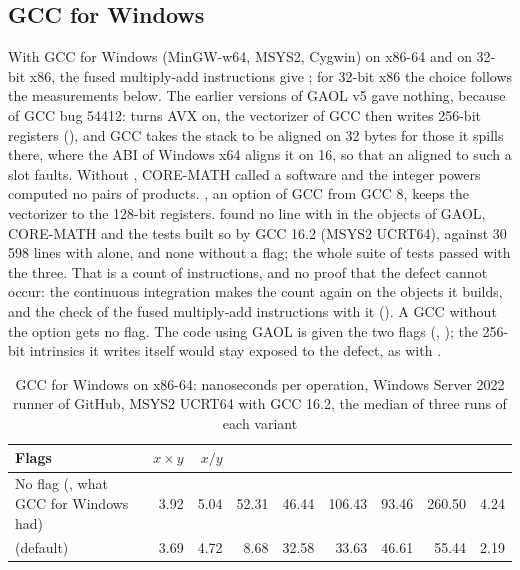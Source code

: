 \subsection{GCC for Windows}\label{sec:install-gcc-windows}

With GCC for Windows (MinGW-w64, MSYS2, Cygwin) on x86-64 and on 32-bit x86,
the fused multiply-add instructions give
; for 32-bit x86 the choice follows
the measurements below.\newinvfive{} The earlier versions of GAOL v5 gave nothing, because of GCC bug
54412:  turns AVX on, the vectorizer of GCC then writes 256-bit
registers (), and GCC takes the stack to be aligned on 32 bytes
for those it spills there, where the ABI of Windows x64 aligns it on 16, so
that an aligned  to such a slot faults. Without ,
CORE-MATH called a software  and the integer powers computed no
pairs of products. , an option of GCC from
GCC 8, keeps the vectorizer to the 128-bit registers.  found no line with  in the objects of GAOL,
CORE-MATH and the tests built so by GCC 16.2 (MSYS2 UCRT64), against 30\,598
lines with  alone, and none without a flag; the whole suite of
tests passed with the three. That is a count of instructions, and no proof
that the defect cannot occur: the continuous integration makes the count
again on the objects it builds, and the check of the fused multiply-add
instructions with it (). A GCC without the option gets no
flag. The code using GAOL is given the two flags (,
); the 256-bit intrinsics it writes itself would stay exposed
to the defect, as with .

\begin{table}[htbp]
  \centering\renewcommand{\arraystretch}{1.1}\footnotesize
  \setlength{\tabcolsep}{3pt}
  \caption[GCC for Windows on x86-64: nanoseconds per operation (MSYS2 UCRT64, GCC 16.2)]{GCC for Windows on x86-64: nanoseconds per operation, Windows Server 2022 runner of GitHub, MSYS2 UCRT64 with GCC 16.2, the median of three runs of each variant} \label{tab:install-gcc-windows-x64}
  \begin{tabular}{L{3.5cm}rrrrrrrr}
    \hline
    Flags & $x \times y$ & $x / y$ &  &  &
     &  &  & \\
    \hline\hline
    No flag (, what GCC for Windows had) & 3.92 &
    5.04 & 52.31 & 46.44 & 106.43 & 93.46 & 260.50 & 4.24\\
     (default) & 3.69 & 4.72 & 8.68 &
    32.58 & 33.63 & 46.61 & 55.44 & 2.19\\
    \hline
  \end{tabular}

\end{table}

